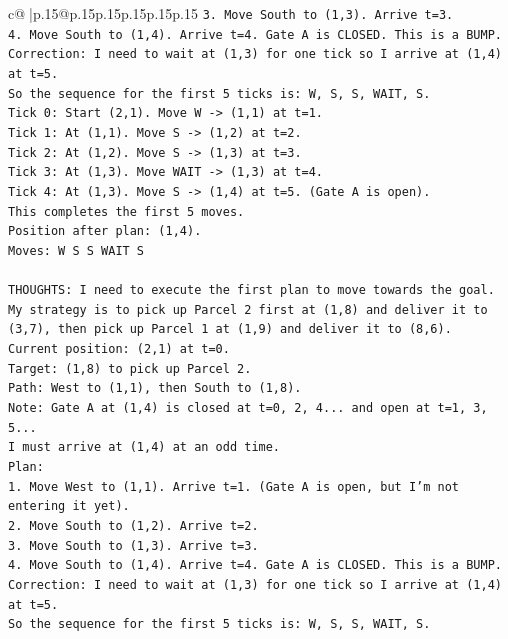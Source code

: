 \documentclass{article}
\begin{document}
{\begin{supertabular}{c@{$\;$}|p{.15\linewidth}@{}p{.15\linewidth}p{.15\linewidth}p{.15\linewidth}p{.15\linewidth}p{.15\linewidth}}
{{{\texttt{3. Move South to (1,3). Arrive t=3.} \\
\texttt{4. Move South to (1,4). Arrive t=4. Gate A is CLOSED. This is a BUMP.} \\
\texttt{Correction: I need to wait at (1,3) for one tick so I arrive at (1,4) at t=5.} \\
\texttt{So the sequence for the first 5 ticks is: W, S, S, WAIT, S.} \\
\texttt{Tick 0: Start (2,1). Move W {-}> (1,1) at t=1.} \\
\texttt{Tick 1: At (1,1). Move S {-}> (1,2) at t=2.} \\
\texttt{Tick 2: At (1,2). Move S {-}> (1,3) at t=3.} \\
\texttt{Tick 3: At (1,3). Move WAIT {-}> (1,3) at t=4.} \\
\texttt{Tick 4: At (1,3). Move S {-}> (1,4) at t=5. (Gate A is open).} \\
\texttt{This completes the first 5 moves.} \\
\texttt{Position after plan: (1,4).} \\
\texttt{Moves: W S S WAIT S} \\
\\ 
\texttt{THOUGHTS: I need to execute the first plan to move towards the goal. My strategy is to pick up Parcel 2 first at (1,8) and deliver it to (3,7), then pick up Parcel 1 at (1,9) and deliver it to (8,6).} \\
\texttt{Current position: (2,1) at t=0.} \\
\texttt{Target: (1,8) to pick up Parcel 2.} \\
\texttt{Path: West to (1,1), then South to (1,8).} \\
\texttt{Note: Gate A at (1,4) is closed at t=0, 2, 4... and open at t=1, 3, 5...} \\
\texttt{I must arrive at (1,4) at an odd time.} \\
\texttt{Plan:} \\
\texttt{1. Move West to (1,1). Arrive t=1. (Gate A is open, but I'm not entering it yet).} \\
\texttt{2. Move South to (1,2). Arrive t=2.} \\
\texttt{3. Move South to (1,3). Arrive t=3.} \\
\texttt{4. Move South to (1,4). Arrive t=4. Gate A is CLOSED. This is a BUMP.} \\
\texttt{Correction: I need to wait at (1,3) for one tick so I arrive at (1,4) at t=5.} \\
\texttt{So the sequence for the first 5 ticks is: W, S, S, WAIT, S.} \\
}}}
\end{supertabular}}
\end{document}
